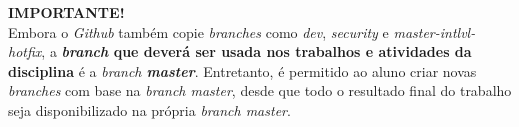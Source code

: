 \documentclass[11pt]{article}
\newcommand*{\alert}[1]{\vspace{0.4cm}\colorbox{gray!60!white}{\parbox{0.92\linewidth}{{\centering \textbf{IMPORTANTE!}\\}#1}}\vspace{0.4cm}}
\begin{document}
\begin{enumerate}
  \alert{Embora o \textit{Github} também copie \textit{branches} como \textit{dev}, \textit{security} e \textit{master-intlvl-hotfix}, a \textbf{\textit{branch} que deverá ser usada nos trabalhos e atividades da disciplina} é a \textit{branch \textbf{master}}. Entretanto, é permitido ao aluno criar novas \textit{branches} com base na \textit{branch master}, desde que todo o resultado final do trabalho seja disponibilizado na própria \textit{branch master}.}
\end{enumerate}
\end{document}
